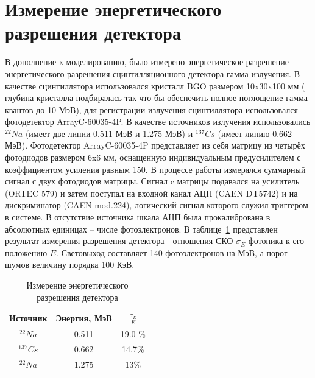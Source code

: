 \documentclass[a4paper]{panl}
\begin{document}
\section*{Измерение энергетического разрешения детектора}
В дополнение к моделированию, было измерено энергетическое разрешение энергетического разрешения сцинтилляционного детектора гамма-излучения. В качестве сцинтиллятора использовался кристалл BGO размером 10x30x100 мм ( глубина кристалла подбиралась так что бы обеспечить полное поглощение гамма-квантов до 10 МэВ), для регистрации излучения сцинтиллятора использовался фотодетектор ArrayC-60035-4P. В качестве источников излучения использовались $^{22}Na$ (имеет две линии 0.511 МэВ и 1.275 МэВ) и $^{137}Cs$ (имеет линию 0.662 МэВ). Фотодетектор ArrayC-60035-4P  представляет из себя матрицу из четырёх фотодиодов размером 6x6 мм, оснащенную индивидуальным предусилителем с коэффициентом усиления равным 150.  В процессе работы измерялся суммарный сигнал с двух фотодиодов матрицы. Сигнал c матрицы подавался на усилитель (ORTEC 579) и затем поступал на входной канал АЦП (CAEN DT5742) и на дискриминатор (CAEN mod.224), логический сигнал которого служил триггером в системе. В отсутствие источника шкала АЦП была прокалибрована в абсолютных единицах – числе фотоэлектронов. В таблице~\ref{tab:ex} представлен результат измерения разрешения детектора -  отношения СКО $\sigma_E$ фотопика к его положению $E$. Световыход составляет 140 фотоэлектронов на МэВ, а порог шумов величину порядка 100 КэВ.\\
\begin{table}
    \caption{Измерение энергетического разрешения детектора}
    \label{tab:ex}
    \begin{center} 
        \begin{tabular}[c]{|c|c|c|}
            \hline 
            Источник & Энергия, МэВ & $\frac{\sigma_E}{E}$\\
            \hline 
            $^{22}Na$&0.511 & 19.0 \%  \\ 
            \hline 
            $^{137}Cs$&0.662 & 14.7\%\\ 
            \hline 
            $^{22}Na$& 1.275 & 13\% \\
            \hline 
        \end{tabular} 
    \end{center}
\end{table}
\end{document}
